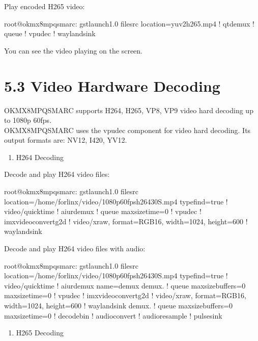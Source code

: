 \documentclass[letterpaper,10pt,openany,english]{sphinxmanual}
\begin{document}
\sphinxAtStartPar
Play encoded H265 video:

\begin{sphinxVerbatim}[commandchars=\\\{\}]
root@ok\PYGZhy{}mx8mpq\PYGZhy{}smarc:\PYGZti{}\PYGZsh{} gst\PYGZhy{}launch\PYGZhy{}1.0 filesrc location=yuv2h265.mp4 ! qtdemux ! queue ! vpudec ! waylandsink
\end{sphinxVerbatim}

\sphinxAtStartPar
You can see the video playing on the screen.


\section{5.3 Video Hardware Decoding}
\label{\detokenize{linux-manual:video-hardware-decoding}}
\sphinxAtStartPar
OK\sphinxhyphen{}MX8MPQ\sphinxhyphen{}SMARC supports H264, H265, VP8, VP9 video hard decoding up to 1080p 60fps.\\
OK\sphinxhyphen{}MX8MPQ\sphinxhyphen{}SMARC uses the vpudec component for video hard decoding. Its output formats are: NV12, I420, YV12.
\begin{enumerate}
%
\item {} 
\sphinxAtStartPar
H264 Decoding

\end{enumerate}

\sphinxAtStartPar
Decode and play H264 video files:

\begin{sphinxVerbatim}[commandchars=\\\{\}]
root@ok\PYGZhy{}mx8mpq\PYGZhy{}smarc:\PYGZti{}\PYGZsh{} gst\PYGZhy{}launch\PYGZhy{}1.0 filesrc location=/home/forlinx/video/1080p\PYGZus{}60fps\PYGZus{}h264\PYGZhy{}30S.mp4 typefind=true ! video/quicktime ! aiurdemux ! queue max\PYGZhy{}size\PYGZhy{}time=0 ! vpudec ! imxvideoconvert\PYGZus{}g2d ! video/x\PYGZhy{}raw, format=RGB16, width=1024, height=600 ! waylandsink
\end{sphinxVerbatim}

\sphinxAtStartPar
Decode and play H264 video files with audio:

\begin{sphinxVerbatim}[commandchars=\\\{\}]
root@ok\PYGZhy{}mx8mpq\PYGZhy{}smarc:\PYGZti{}\PYGZsh{} gst\PYGZhy{}launch\PYGZhy{}1.0 filesrc location=/home/forlinx/video/1080p\PYGZus{}60fps\PYGZus{}h264\PYGZhy{}30S.mp4 typefind=true ! video/quicktime ! aiurdemux name=demux demux. ! queue max\PYGZhy{}size\PYGZhy{}buffers=0 max\PYGZhy{}size\PYGZhy{}time=0 ! vpudec ! imxvideoconvert\PYGZus{}g2d ! video/x\PYGZhy{}raw, format=RGB16, width=1024, height=600 ! waylandsink demux. ! queue max\PYGZhy{}size\PYGZhy{}buffers=0 max\PYGZhy{}size\PYGZhy{}time=0 ! decodebin ! audioconvert ! audioresample ! pulsesink
\end{sphinxVerbatim}
\begin{enumerate}
%
\setcounter{enumi}{1}
\item {} 
\sphinxAtStartPar
H265 Decoding

\end{enumerate}
\end{document}
